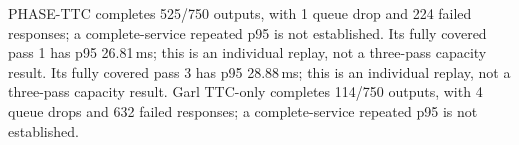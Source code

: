 PHASE-TTC completes 525/750 outputs, with 1 queue drop and 224 failed responses; a complete-service repeated p95 is not established. Its fully covered pass 1 has p95 26.81\,ms; this is an individual replay, not a three-pass capacity result. Its fully covered pass 3 has p95 28.88\,ms; this is an individual replay, not a three-pass capacity result. Garl TTC-only completes 114/750 outputs, with 4 queue drops and 632 failed responses; a complete-service repeated p95 is not established.
